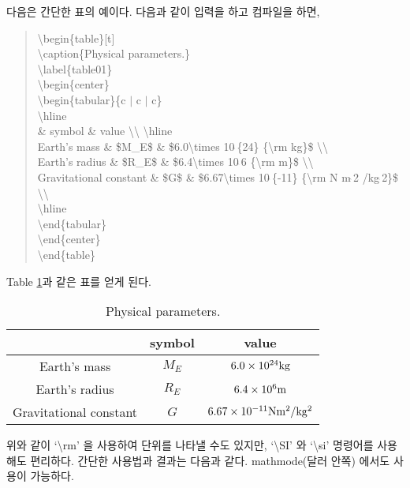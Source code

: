 \documentclass{gshs-report-v1.2}
\begin{document}
다음은 간단한 표의 예이다. 다음과 같이 입력을 하고 컴파일을 하면,
\begin{quote}
	{\textbackslash}begin\{table\}[t]\\
	{\textbackslash}caption\{Physical parameters.\}\\
	{\textbackslash}label\{table01\}\\
	{\textbackslash}begin\{center\}\\
	{\textbackslash}begin\{tabular\}\{c $|$ c $|$ c\}\\
	{\textbackslash}hline\\
	\& symbol \& value {\textbackslash}{\textbackslash} {\textbackslash}hline \\
	Earth's mass \& \$M\_E\$ \& \$6.0{\textbackslash}times 10$\hat{\ }$\{24\} \{{\textbackslash}rm kg\}\$ {\textbackslash}{\textbackslash}\\
	Earth's radius \& \$R\_E\$ \& \$6.4{\textbackslash}times 10$\hat{\ }$6 \{{\textbackslash}rm m\}\$ {\textbackslash}{\textbackslash}\\
	Gravitational constant \& \$G\$ \& \$6.67{\textbackslash}times 10$\hat{\ }$\{-11\} \{{\textbackslash}rm N m$\hat{\ }$2 /kg$\hat{\ }$2\}\$ {\textbackslash}{\textbackslash} \\
	{\textbackslash}hline\\
	{\textbackslash}end\{tabular\}\\
	{\textbackslash}end\{center\}\\
	{\textbackslash}end\{table\}
\end{quote}
Table \ref{table01}과 같은 표를 얻게 된다.
\begin{table}[t]
	\caption{Physical parameters.} \label{table01}
	\begin{center}
		\begin{tabular}{c|c|c}
			\hline
			& symbol & value \\ \hline
			Earth's mass & $M_E$ & $6.0\times 10^{24} {\rm kg}$ \\
			Earth's radius & $R_E$ & $6.4\times 10^6 {\rm m}$ \\
			Gravitational constant & $G$ & $6.67\times 10^{-11} {\rm N m^2 /kg^2}$ \\ \hline
		\end{tabular}
	\end{center}
\end{table}

위와 같이 `\textbackslash rm' 을 사용하여 단위를 나타낼 수도 있지만,
`\textbackslash SI' 와 `\textbackslash si' 명령어를 사용해도 편리하다. 
간단한 사용법과 결과는 다음과 같다. mathmode(달러 안쪽) 에서도 사용이 가능하다.
\end{document}
